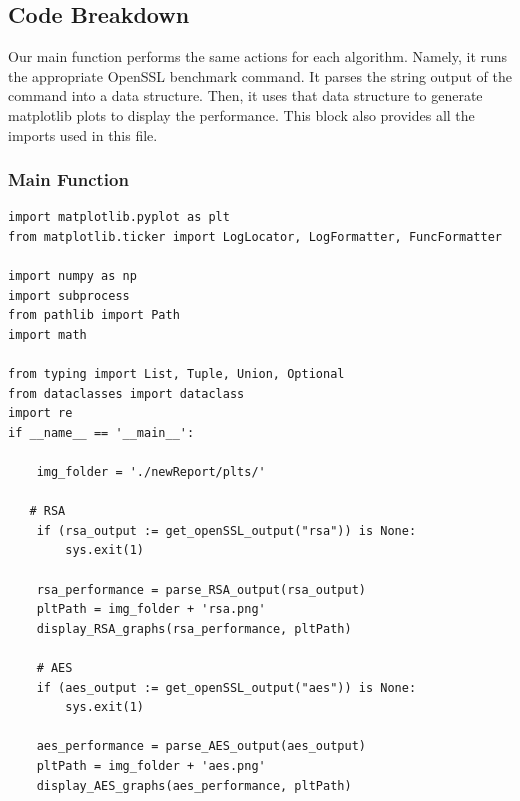\documentclass[11pt]{article}
\begin{document}
\subsection*{Code Breakdown}
Our main function performs the same actions for each algorithm. Namely, it runs the appropriate OpenSSL benchmark command. It parses the string output of the command into a data structure. Then, it uses that data structure to generate matplotlib plots to display the performance. This block also provides all the imports used in this file.

\subsubsection*{Main Function}

\begin{framed}
\begin{verbatim}
import matplotlib.pyplot as plt
from matplotlib.ticker import LogLocator, LogFormatter, FuncFormatter

import numpy as np
import subprocess
from pathlib import Path
import math

from typing import List, Tuple, Union, Optional
from dataclasses import dataclass
import re
if __name__ == '__main__':
    
    img_folder = './newReport/plts/'

   # RSA
    if (rsa_output := get_openSSL_output("rsa")) is None:
        sys.exit(1)

    rsa_performance = parse_RSA_output(rsa_output)
    pltPath = img_folder + 'rsa.png'
    display_RSA_graphs(rsa_performance, pltPath)

    # AES
    if (aes_output := get_openSSL_output("aes")) is None:
        sys.exit(1)

    aes_performance = parse_AES_output(aes_output)
    pltPath = img_folder + 'aes.png'
    display_AES_graphs(aes_performance, pltPath) 
\end{verbatim}
\end{framed}
\end{document}
